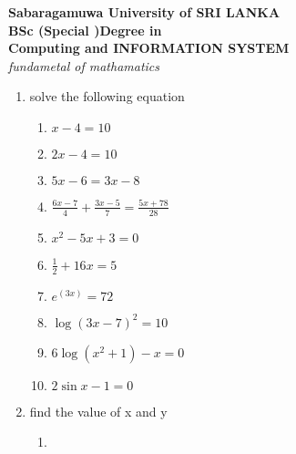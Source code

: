 \documentclass[10pt]{article}
\begin{document}
\begin{center}
	\textbf{Sabaragamuwa University of SRI LANKA \\
	BSc (Special )Degree in\\ Computing and INFORMATION SYSTEM\\}
\textsl{fundametal of mathamatics }\\
\end{center}
\begin{enumerate}
	\item solve the following equation
	 \begin{enumerate}
	 	\item \(x-4=10\)
	 	\item \(2x-4=10\)
	 	\item \(5x-6=3x-8\)
	 	\item \(\frac{6x-7}{4}+\frac{3x-5}{7}=\frac{5x+78}{28}\)
	 	\item \(x^2-5x+3=0\)
	 	\item \(\frac{1}{2}+16x=5\)
	 	\item \(e^(3x)=72\)
	 	\item \(\log(3x-7)^2=10\)
	 	\item \(6\log(x^2+1)-x=0\)
	 	\item \(2\sin x-1=0\)
	 
	 \end{enumerate}
 \item find the value of x and y
 \begin{enumerate}
 	
 	\item 
 \end{enumerate}
\end{enumerate}
\end{document}
